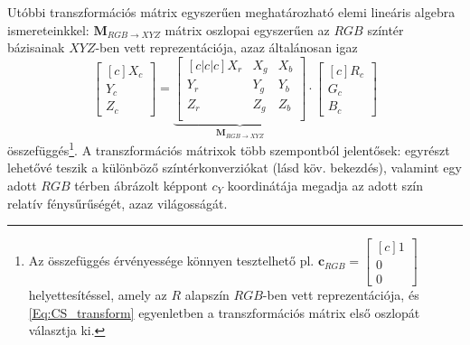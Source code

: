 Utóbbi transzformációs mátrix egyszerűen meghatározható elemi lineáris algebra ismereteinkkel:
$\mathbf{M}_{R\!G\!B \rightarrow X\!Y\!Z}$  mátrix oszlopai egyszerűen az $RGB$ színtér bázisainak $XYZ$-ben vett reprezentációja, azaz általánosan igaz
\begin{equation}
\begin{bmatrix}[c]
       X_c \\[0.3em]
       Y_c \\[0.3em]
       Z_c \end{bmatrix}
       = 
       \underbrace{
  \begin{bmatrix}[c|c|c]
   X_r & X_g & X_b  \\
   Y_r & Y_g & Y_b \\
   Z_r & Z_g & Z_b  \\
\end{bmatrix}}_{\mathbf{M}_{R\!G\!B \rightarrow X\!Y\!Z}}
\cdot
\begin{bmatrix}[c]
       R_c \\[0.3em]
       G_c \\[0.3em]
       B_c \end{bmatrix}
\label{Eq:CS_transform}
\end{equation}
összefüggés\footnote{Az összefüggés érvényessége könnyen tesztelhető pl. $\mathbf{c}_{RGB} = \begin{bmatrix}[c]
       1 \\[0.3em]
       0 \\[0.3em]
       0 \end{bmatrix}$ helyettesítéssel, amely az $R$ alapszín $RGB$-ben vett reprezentációja, és \eqref{Eq:CS_transform} egyenletben a transzformációs mátrix első oszlopát választja ki.}.
A transzformációs mátrixok több szempontból jelentősek: 
egyrészt lehetővé teszik a különböző színtérkonverziókat (lásd köv. bekezdés), valamint egy adott $RGB$ térben ábrázolt képpont $c_Y$ koordinátája megadja az adott szín relatív fénysűrűségét, azaz világosságát.

